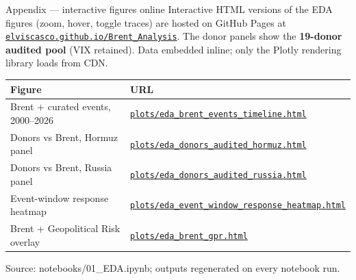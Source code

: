 \documentclass[aspectratio=169,11pt]{beamer}
\newcommand{\smalltext}[1]{{\footnotesize\textcolor{muted}{#1}}}
\newcommand{\hd}[1]{\textbf{#1}}
\begin{document}
\begin{frame}{Appendix --- interactive figures online}
  \footnotesize
  Interactive HTML versions of the EDA figures (zoom, hover, toggle traces) are hosted on GitHub Pages at
  \href{https://elviscasco.github.io/Brent_Analysis/}{\texttt{elviscasco.github.io/Brent\_Analysis}}.
  The donor panels show the \hd{19-donor audited pool} (VIX retained). Data embedded inline; only the Plotly
  rendering library loads from CDN.

  \vspace{0.6em}
  \begin{tabular}{@{}p{} p{}@{}}
    \toprule
    \hd{Figure} & \hd{URL} \\
    \midrule
    Brent + curated events, 2000--2026 &
      \href{https://elviscasco.github.io/Brent_Analysis/plots/eda_brent_events_timeline.html}{\texttt{plots/eda\_brent\_events\_timeline.html}} \\[0.4em]
    Donors vs Brent, Hormuz panel &
      \href{https://elviscasco.github.io/Brent_Analysis/plots/eda_donors_audited_hormuz.html}{\texttt{plots/eda\_donors\_audited\_hormuz.html}} \\[0.4em]
    Donors vs Brent, Russia panel &
      \href{https://elviscasco.github.io/Brent_Analysis/plots/eda_donors_audited_russia.html}{\texttt{plots/eda\_donors\_audited\_russia.html}} \\[0.4em]
    Event-window response heatmap &
      \href{https://elviscasco.github.io/Brent_Analysis/plots/eda_event_window_response_heatmap.html}{\texttt{plots/eda\_event\_window\_response\_heatmap.html}} \\[0.4em]
    Brent + Geopolitical Risk overlay &
      \href{https://elviscasco.github.io/Brent_Analysis/plots/eda_brent_gpr.html}{\texttt{plots/eda\_brent\_gpr.html}} \\
    \bottomrule
  \end{tabular}

  \vspace{0.6em}
  \smalltext{Source: notebooks/01\_EDA.ipynb; outputs regenerated on every notebook run.}
\end{frame}
\end{document}
